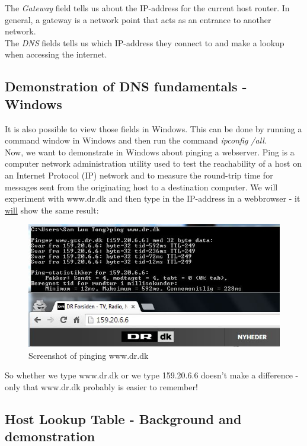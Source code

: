The \textit{Gateway} field tells us about the IP-address for the current host router. In general, a gateway is a network point that acts as an entrance to another network. \\

The \textit{DNS} fields tells us which IP-address they connect to and make a lookup when accessing the internet. 

\subsection{Demonstration of DNS fundamentals - Windows}

It is also possible to view those fields in Windows. This can be done by running a command window in Windows and then run the command \textit{ipconfig /all}. \\

Now, we want to demonstrate in Windows about pinging a webserver. Ping is a computer network administration utility used to test the reachability of a host on an Internet Protocol (IP) network and to measure the round-trip time for messages sent from the originating host to a destination computer. 
We will experiment with www.dr.dk and then type in the IP-address in a webbrowser - it \underline{will} show the same result:

\begin{figure}[ht!]
\centering
\includegraphics[width=150mm]{img/ping.png}
\caption{Screenshot of pinging www.dr.dk}
\label{ping}
\end{figure}

So whether we type www.dr.dk or we type 159.20.6.6 doesn't make a difference - only that www.dr.dk probably is easier to remember! \\

\subsection{Host Lookup Table - Background and demonstration}

